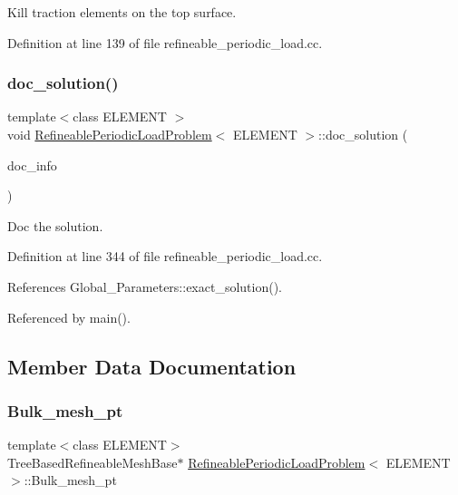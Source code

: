 Kill traction elements on the top surface. 



Definition at line 139 of file refineable\+\_\+periodic\+\_\+load.\+cc.

\mbox{\label{classRefineablePeriodicLoadProblem_ac10c477b8edd2d0b7d3a69e65184356a}} 
\subsubsection{\texorpdfstring{doc\+\_\+solution()}{doc\_solution()}}
{\footnotesize\ttfamily template$<$class E\+L\+E\+M\+E\+NT $>$ \\
void \hyperlink{classRefineablePeriodicLoadProblem}{Refineable\+Periodic\+Load\+Problem}$<$ E\+L\+E\+M\+E\+NT $>$\+::doc\+\_\+solution (\begin{DoxyParamCaption}\item[{Doc\+Info \&}]{doc\+\_\+info }\end{DoxyParamCaption})}



Doc the solution. 



Definition at line 344 of file refineable\+\_\+periodic\+\_\+load.\+cc.



References Global\+\_\+\+Parameters\+::exact\+\_\+solution().



Referenced by main().



\subsection{Member Data Documentation}
\mbox{\label{classRefineablePeriodicLoadProblem_a98440a404cb3de29aad5a93f768889cd}} 
\subsubsection{\texorpdfstring{Bulk\+\_\+mesh\+\_\+pt}{Bulk\_mesh\_pt}}
{\footnotesize\ttfamily template$<$class E\+L\+E\+M\+E\+NT$>$ \\
Tree\+Based\+Refineable\+Mesh\+Base$\ast$ \hyperlink{classRefineablePeriodicLoadProblem}{Refineable\+Periodic\+Load\+Problem}$<$ E\+L\+E\+M\+E\+NT $>$\+::Bulk\+\_\+mesh\+\_\+pt\hspace{0.3cm}{\ttfamily [private]}}



